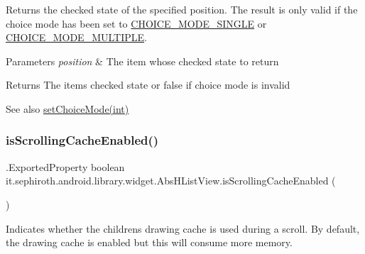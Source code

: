 Returns the checked state of the specified position. The result is only valid if the choice mode has been set to \hyperlink{}{C\+H\+O\+I\+C\+E\+\_\+\+M\+O\+D\+E\+\_\+\+S\+I\+N\+G\+LE} or \hyperlink{}{C\+H\+O\+I\+C\+E\+\_\+\+M\+O\+D\+E\+\_\+\+M\+U\+L\+T\+I\+P\+LE}.


\begin{DoxyParams}{Parameters}
{\em position} & The item whose checked state to return \\
\hline
\end{DoxyParams}
\begin{DoxyReturn}{Returns}
The item\textquotesingle{}s checked state or {\ttfamily false} if choice mode is invalid
\end{DoxyReturn}
\begin{DoxySeeAlso}{See also}
\hyperlink{classit_1_1sephiroth_1_1android_1_1library_1_1widget_1_1_abs_h_list_view_aac2532ddba38bddaecf4a009a9aa96fb}{set\+Choice\+Mode(int)} 
\end{DoxySeeAlso}
\mbox{\label{classit_1_1sephiroth_1_1android_1_1library_1_1widget_1_1_abs_h_list_view_afdbd5760313bd2ac23b77d93955952f0}} 
\subsubsection{\texorpdfstring{is\+Scrolling\+Cache\+Enabled()}{isScrollingCacheEnabled()}}
{\footnotesize\ttfamily .Exported\+Property boolean it.\+sephiroth.\+android.\+library.\+widget.\+Abs\+H\+List\+View.\+is\+Scrolling\+Cache\+Enabled (\begin{DoxyParamCaption}{ }\end{DoxyParamCaption})}

Indicates whether the children\textquotesingle{}s drawing cache is used during a scroll. By default, the drawing cache is enabled but this will consume more memory.

